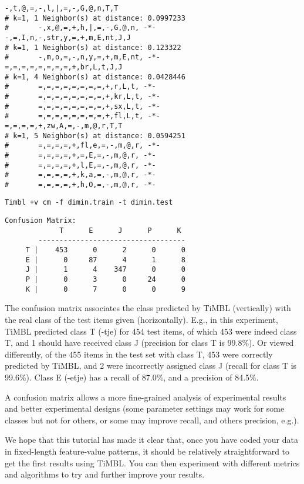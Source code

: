 \documentclass{report}
\begin{document}
{\small
\begin{verbatim}
-,t,@,=,-,l,|,=,-,G,@,n,T,T
# k=1, 1 Neighbor(s) at distance: 0.0997233
#       -,x,@,=,+,h,|,=,-,G,@,n, -*-
-,=,I,n,-,str,y,=,+,m,E,nt,J,J
# k=1, 1 Neighbor(s) at distance: 0.123322
#       -,m,o,=,-,n,y,=,+,m,E,nt, -*-
=,=,=,=,=,=,=,=,+,br,L,t,J,J
# k=1, 4 Neighbor(s) at distance: 0.0428446
#       =,=,=,=,=,=,=,=,+,r,L,t, -*-
#       =,=,=,=,=,=,=,=,+,kr,L,t, -*-
#       =,=,=,=,=,=,=,=,+,sx,L,t, -*-
#       =,=,=,=,=,=,=,=,+,fl,L,t, -*-
=,=,=,=,+,zw,A,=,-,m,@,r,T,T
# k=1, 5 Neighbor(s) at distance: 0.0594251
#       =,=,=,=,+,fl,e,=,-,m,@,r, -*-
#       =,=,=,=,+,=,E,=,-,m,@,r, -*-
#       =,=,=,=,+,l,E,=,-,m,@,r, -*-
#       =,=,=,=,+,k,a,=,-,m,@,r, -*-
#       =,=,=,=,+,h,O,=,-,m,@,r, -*-                    
\end{verbatim}
}

{\small
\begin{verbatim}
Timbl +v cm -f dimin.train -t dimin.test
\end{verbatim}
}

{\small
\begin{verbatim}
Confusion Matrix:
             T      E      J      P      K 
        -----------------------------------
     T |    453      0      2      0      0 
     E |      0     87      4      1      8 
     J |      1      4    347      0      0 
     P |      0      3      0     24      0 
     K |      0      7      0      0      9 

\end{verbatim}
}

The confusion matrix associates the class predicted by TiMBL
(vertically) with the real class of the test items given
(horizontally). E.g., in this experiment, TiMBL predicted class T
(-tje) for 454 test items, of which 453 were indeed class T, and 1
should have received class J (precision for class T is 99.8\%). Or
viewed differently, of the 455 items in the test set with class T, 453
were correctly predicted by TiMBL, and 2 were incorrectly assigned
class J (recall for class T is 99.6\%). Class E (-etje) has a recall
of 87.0\%, and a precision of 84.5\%.

A confusion matrix allows a more fine-grained analysis of experimental
results and better experimental designs (some parameter settings may
work for some classes but not for others, or some may improve recall,
and others precision, e.g.).

We hope that this tutorial has made it clear that, once you have coded
your data in fixed-length feature-value patterns, it should be
relatively straightforward to get the first results using TiMBL. You
can then experiment with different metrics and algorithms to try and
further improve your results.
\end{document}
